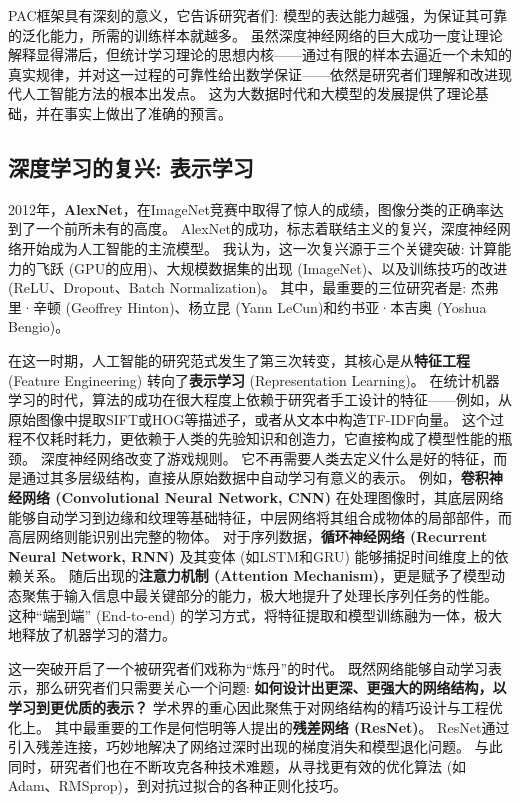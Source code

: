 \documentclass[12pt, a4paper]{article}
\begin{document}
PAC框架具有深刻的意义，它告诉研究者们: 模型的表达能力越强，为保证其可靠的泛化能力，所需的训练样本就越多。
虽然深度神经网络的巨大成功一度让理论解释显得滞后，但统计学习理论的思想内核——通过有限的样本去逼近一个未知的真实规律，并对这一过程的可靠性给出数学保证——依然是研究者们理解和改进现代人工智能方法的根本出发点。
这为大数据时代和大模型的发展提供了理论基础，并在事实上做出了准确的预言。

\subsection{深度学习的复兴: 表示学习}

2012年，\textbf{AlexNet}，在ImageNet竞赛中取得了惊人的成绩，图像分类的正确率达到了一个前所未有的高度。
AlexNet的成功，标志着联结主义的复兴，深度神经网络开始成为人工智能的主流模型。
我认为，这一次复兴源于三个关键突破: 计算能力的飞跃 (GPU的应用)、大规模数据集的出现 (ImageNet)、以及训练技巧的改进 (ReLU、Dropout、Batch Normalization)。
其中，最重要的三位研究者是: 杰弗里·辛顿 (Geoffrey Hinton)、杨立昆 (Yann LeCun)和约书亚·本吉奥 (Yoshua Bengio)。

在这一时期，人工智能的研究范式发生了第三次转变，其核心是从\textbf{特征工程} (Feature Engineering) 转向了\textbf{表示学习} (Representation Learning)。
在统计机器学习的时代，算法的成功在很大程度上依赖于研究者手工设计的特征——例如，从原始图像中提取SIFT或HOG等描述子，或者从文本中构造TF-IDF向量。
这个过程不仅耗时耗力，更依赖于人类的先验知识和创造力，它直接构成了模型性能的瓶颈。
深度神经网络改变了游戏规则。
它不再需要人类去定义什么是好的特征，而是通过其多层级结构，直接从原始数据中自动学习有意义的表示。
例如，\textbf{卷积神经网络 (Convolutional Neural Network, CNN)} 在处理图像时，其底层网络能够自动学习到边缘和纹理等基础特征，中层网络将其组合成物体的局部部件，而高层网络则能识别出完整的物体。
对于序列数据，\textbf{循环神经网络 (Recurrent Neural Network, RNN)} 及其变体 (如LSTM和GRU) 能够捕捉时间维度上的依赖关系。
随后出现的\textbf{注意力机制 (Attention Mechanism)}，更是赋予了模型动态聚焦于输入信息中最关键部分的能力，极大地提升了处理长序列任务的性能。
这种“端到端” (End-to-end) 的学习方式，将特征提取和模型训练融为一体，极大地释放了机器学习的潜力。

这一突破开启了一个被研究者们戏称为“炼丹”的时代。
既然网络能够自动学习表示，那么研究者们只需要关心一个问题: \textbf{如何设计出更深、更强大的网络结构，以学习到更优质的表示？}
学术界的重心因此聚焦于对网络结构的精巧设计与工程优化上。
其中最重要的工作是何恺明等人提出的\textbf{残差网络 (ResNet)}。
ResNet通过引入残差连接，巧妙地解决了网络过深时出现的梯度消失和模型退化问题。
与此同时，研究者们也在不断攻克各种技术难题，从寻找更有效的优化算法 (如Adam、RMSprop)，到对抗过拟合的各种正则化技巧。
\end{document}
